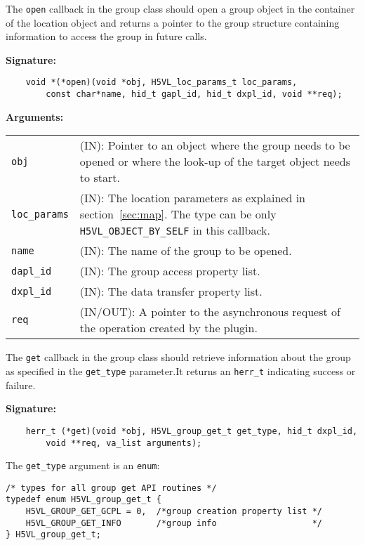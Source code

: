 The {\tt open} callback in the group class should open a group object
in the container of the location object and returns a pointer to the
group structure containing information to access the group in future
calls.

\textbf{Signature:}
\begin{lstlisting}
    void *(*open)(void *obj, H5VL_loc_params_t loc_params, 
        const char*name, hid_t gapl_id, hid_t dxpl_id, void **req);
\end{lstlisting}

\textbf{Arguments:}\\
\begin{tabular}{l p{10cm}}
  {\tt obj} & (IN): Pointer to an object where the group needs to be
  opened or where the look-up of the target object needs to start.\\
  {\tt loc\_params} & (IN): The location parameters as explained in
  section~\ref{sec:map}. The type can be only {\tt
    H5VL\_OBJECT\_BY\_SELF} in this callback. \\
  {\tt name} & (IN): The name of the group to be opened.\\
  {\tt dapl\_id} & (IN): The group access property list.\\
  {\tt dxpl\_id} & (IN): The data transfer property list.\\
  {\tt req} & (IN/OUT): A pointer to the asynchronous request of the
  operation created by the plugin.\\
\end{tabular}

The {\tt get} callback in the group class should retrieve information
about the group as specified in the {\tt get\_type} parameter.It
returns an {\tt herr\_t} indicating success or failure.

\textbf{Signature:}
\begin{lstlisting}
    herr_t (*get)(void *obj, H5VL_group_get_t get_type, hid_t dxpl_id, 
        void **req, va_list arguments);
\end{lstlisting}

The {\tt get\_type} argument is an {\tt enum}:
\begin{lstlisting}
/* types for all group get API routines */
typedef enum H5VL_group_get_t {
    H5VL_GROUP_GET_GCPL = 0,  /*group creation property list */
    H5VL_GROUP_GET_INFO       /*group info                   */
} H5VL_group_get_t;
\end{lstlisting}

